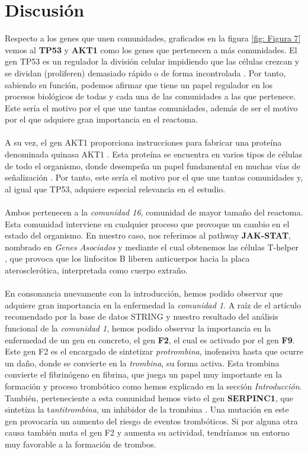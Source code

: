 \section{Discusión}
\hfill


\hfill

Respecto a los genes que unen comunidades, graficados en la figura \ref*{fig: Figura 7} vemos al \textbf{TP53} y \textbf{AKT1} como los genes que pertenecen a más comunidades. El gen TP53 es un regulador la división celular impidiendo que las células crezcan y se dividan (proliferen) demasiado rápido o de forma incontrolada \cite{TP53}. Por tanto, sabiendo su función, podemos afirmar que tiene un papel regulador en los procesos biológicos de todas y cada una de las comunidades a las que pertenece. Este sería el motivo por el que une tantas comunidades, además de ser el motivo por el que adquiere gran importancia en el reactoma.\\\\  A su vez, el gen AKT1 proporciona instrucciones para fabricar una proteína denominada quinasa AKT1 \cite{AKT1}. Esta proteína se encuentra en varios tipos de células de todo el organismo, donde desempeña un papel fundamental en muchas vías de señalización \cite{AKT1}. Por tanto, este sería el motivo por el que une tantas comunidades y, al igual que TP53, adquiere especial relevancia en el estudio.\\\\
Ambos pertenecen a la \textit{comunidad 16}, comunidad de mayor tamaño del reactoma. Esta comunidad interviene en cualquier proceso que provoque un cambio en el estado del organismo. En nuestro caso, nos referimos al pathway \textbf{JAK-STAT}, nombrado en \textit{Genes Asociados} y mediante el cual obtenemos las células T-helper \cite{pathway}, que provoca que los linfocitos B liberen anticuerpos hacia la placa aterosclerótica, interpretada como cuerpo extraño.\\\\
En consonancia nuevamente con la introducción, hemos podido observar que adquiere gran importancia en la enfermedad la \textit{comunidad 1}. A raíz de el artículo recomendado \cite{F2_F9} por la base de datos STRING \cite{STRING}  y nuestro resultado del análisis funcional de la \textit{comunidad 1}, hemos podido observar la importancia en la enfermedad de un gen en concreto, el gen \textbf{F2}, el cual es activado por el gen \textbf{F9}. Este gen F2 es el encargado de sintetizar \textit{protrombina}, inofensiva hasta que ocurre un daño, donde se convierte en la \textit{trombina}, su forma activa. Esta trombina convierte el fibrinógeno en fibrina, que juega un papel muy importante en la formación y proceso trombótico como hemos explicado en la sección \textit{Introducción}. También, perteneciente a esta comunidad hemos visto el gen \textbf{SERPINC1}, que sintetiza la t\textit{antitrombina}, un inhibidor de la trombina \cite{SERPINC1}. Una mutación en este gen provocaría un aumento del riesgo de eventos trombóticos. Si por alguna otra causa también muta el gen F2 y aumenta su actividad, tendríamos un entorno muy favorable a la formación de trombos.\\\\
